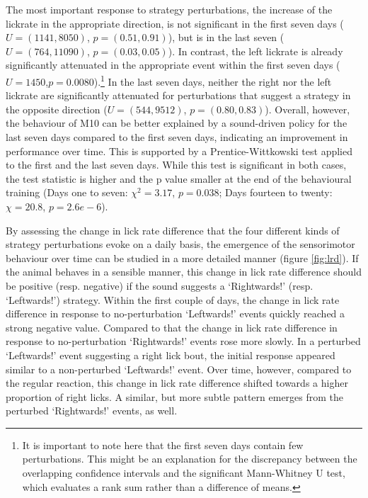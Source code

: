 \documentclass[]{report}
\let\rmarkdownfootnote\footnote%
\def\footnote{\protect\rmarkdownfootnote}
\theoremstyle{definition}
\theoremstyle{definition}
\theoremstyle{definition}
\theoremstyle{remark}
\begin{document}
The most important response to strategy perturbations, the increase of
the lickrate in the appropriate direction, is not significant in the
first seven days (\(U=(1141,8050)\), \(p=(0.51, 0.91)\)), but is in the
last seven (\(U=(764,11090)\), \(p=(0.03,0.05)\)). In contrast, the left
lickrate is already significantly attenuated in the appropriate event
within the first seven days (\(U=1450\),\(p=0.0080\)).\footnote{It is
  important to note here that the first seven days contain few
  perturbations. This might be an explanation for the discrepancy
  between the overlapping confidence intervals and the significant
  Mann-Whitney U test, which evaluates a rank sum rather than a
  difference of means.} In the last seven days, neither the right nor
the left lickrate are significantly attenuated for perturbations that
suggest a strategy in the opposite direction (\(U=(544,9512)\),
\(p=(0.80,0.83)\)). Overall, however, the behaviour of M10 can be better
explained by a sound-driven policy for the last seven days compared to
the first seven days, indicating an improvement in performance over
time. This is supported by a Prentice-Wittkowski test applied to the
first and the last seven days. While this test is significant in both
cases, the test statistic is higher and the p value smaller at the end
of the behavioural training (Days one to seven: \(\chi^2=3.17\),
\(p=0.038\); Days fourteen to twenty: \(\chi=20.8\), \(p=2.6e-6\)).

By assessing the change in lick rate difference that the four different
kinds of strategy perturbations evoke on a daily basis, the emergence of
the sensorimotor behaviour over time can be studied in a more detailed
manner (figure \ref{fig:lrd}). If the animal behaves in a sensible
manner, this change in lick rate difference should be positive (resp.
negative) if the sound suggests a `Rightwards!' (resp. `Leftwards!')
strategy. Within the first couple of days, the change in lick rate
difference in response to no-perturbation `Leftwards!' events quickly
reached a strong negative value. Compared to that the change in lick
rate difference in response to no-perturbation `Rightwards!' events rose
more slowly. In a perturbed `Leftwards!' event suggesting a right lick
bout, the initial response appeared similar to a non-perturbed
`Leftwards!' event. Over time, however, compared to the regular
reaction, this change in lick rate difference shifted towards a higher
proportion of right licks. A similar, but more subtle pattern emerges
from the perturbed `Rightwards!' events, as well.
\end{document}
